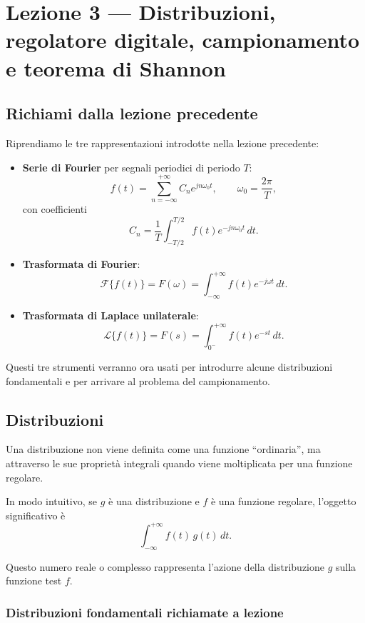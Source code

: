 \chapter{Lezione 3 --- Distribuzioni, regolatore digitale, campionamento e teorema di Shannon}

\section{Richiami dalla lezione precedente}

Riprendiamo le tre rappresentazioni introdotte nella lezione precedente:
\begin{itemize}
    \item \textbf{Serie di Fourier} per segnali periodici di periodo \(T\):
    \[
    f(t)=\sum_{n=-\infty}^{+\infty} C_n e^{j n\omega_0 t},
    \qquad
    \omega_0=\frac{2\pi}{T},
    \]
    con coefficienti
    \[
    C_n=\frac{1}{T}\int_{-T/2}^{T/2} f(t)e^{-j n\omega_0 t}\,dt.
    \]

    \item \textbf{Trasformata di Fourier}:
    \[
    \mathcal{F}\{f(t)\}=F(\omega)=\int_{-\infty}^{+\infty} f(t)e^{-j\omega t}\,dt.
    \]

    \item \textbf{Trasformata di Laplace unilaterale}:
    \[
    \mathcal{L}\{f(t)\}=F(s)=\int_{0^-}^{+\infty} f(t)e^{-st}\,dt.
    \]
\end{itemize}

Questi tre strumenti verranno ora usati per introdurre alcune distribuzioni fondamentali
e per arrivare al problema del campionamento.

\section{Distribuzioni}

Una distribuzione non viene definita come una funzione ``ordinaria'', ma attraverso
le sue proprietà integrali quando viene moltiplicata per una funzione regolare.

In modo intuitivo, se \(g\) è una distribuzione e \(f\) è una funzione regolare,
l'oggetto significativo è
\[
\int_{-\infty}^{+\infty} f(t)\,g(t)\,dt.
\]

Questo numero reale o complesso rappresenta l'azione della distribuzione \(g\)
sulla funzione test \(f\).

\subsection{Distribuzioni fondamentali richiamate a lezione}

